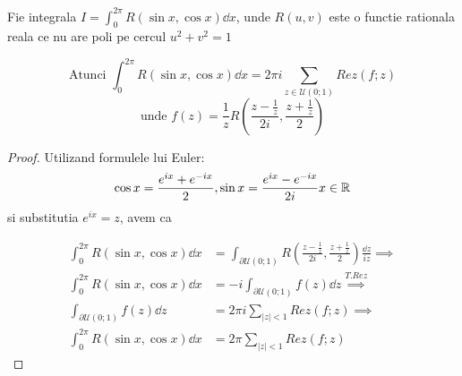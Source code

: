 \begin{tip}[1]
    Fie integrala $\displaystyle I=\int_{0}^{2\pi} R(\sin x, \cos x) \dd x$, unde
    $R(u,v)$ este o functie rationala reala ce nu are poli pe cercul $u^2+v^2=1$

    \[
        \text{Atunci } \int_{0}^{2\pi} R(\sin x , \cos x) \dd x =
        2\pi i \sum_{z\in \mathcal{U}(0;1)} Rez(f;z)
    \]
    \[
        \text{unde } f(z) = \frac{1}{z} R\left(\frac{z-\frac{1}{z}}{2i}, \frac{z+\frac{1}{z}}{2} \right)
    \]

    \begin{proof}
        Utilizand formulele lui Euler:
        \[
            \cos x = \frac{e^{ix}+e^{-ix}}{2}, \sin x = \frac{e^{ix}-e^{-ix}}{2i} x \in \mathbb{R}
        \]
        si substitutia $e^{ix}=z$, avem ca

        \begin{align*}
            \int_{0}^{2\pi} R(\sin x , \cos x) \dd x &=
                \int_{\partial \mathcal{U}(0;1)}
                    R\left(\frac{z-\frac{1}{z}}{2i}, \frac{z+\frac{1}{z}}{2} \right)
                \frac{\dd z}{iz}
            \implies
                        \\
                        \int_{0}^{2\pi} R(\sin x , \cos x) \dd x
                            &= -i \int_{\partial \mathcal{U}(0;1)} f(z) \dd z
            \overset{T.Rez}{\implies}
                        \\
                        \int_{\partial \mathcal{U}(0;1)} f(z) \dd z &=
                2\pi i \sum_{|z|<1} Rez(f;z)
            \implies
                        \\
                        \int_{0}^{2\pi} R(\sin x , \cos x) \dd x &=
                2\pi \sum_{|z|<1} Rez(f;z)
        \end{align*}


    \end{proof}
\end{tip}


